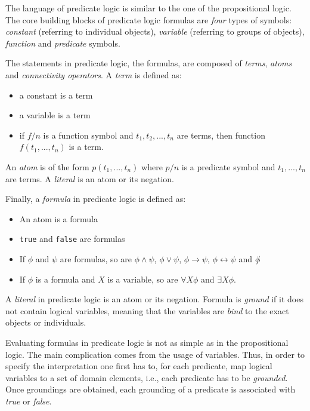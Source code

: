 The language of predicate logic is similar to the one of the propositional logic.
The core building blocks of predicate logic formulas are \textit{four} types of symbols: \textit{constant} (referring to individual objects), \textit{variable} (referring to groups of objects), \textit{function} and \textit{predicate} symbols.


The statements in predicate logic, the formulas, are composed of \textit{terms}, \textit{atoms} and \textit{connectivity operators}.
A \textit{term} is defined as:
\begin{itemize}
	\item a constant is a term
	\item a variable is a term
	\item if $f / n$ is a function symbol and $t_1,t_2,...,t_n$ are terms, then function $f(t_1,...,t_n)$ is a term.
\end{itemize}


An \textit{atom} is of the form $p(t_1,...,t_n)$ where $p/n$ is a predicate symbol and $t_1,...,t_n$ are terms.
A \textit{literal} is an atom or its negation.


Finally, a \textit{formula} in predicate logic is defined as:
\begin{itemize}
	\item An atom is a formula
	\item \texttt{true} and \texttt{false} are formulas
	\item If $\phi$ and $\psi$ are formulas, so are $\phi \wedge \psi$, $\phi \vee \psi$, $\phi \rightarrow \psi$, $\phi \leftrightarrow \psi$ and $\not \phi$
	\item If $\phi$ is a formula and $X$ is a variable, so are $\forall X \phi$ and $\exists X \phi$.
\end{itemize}


A \textit{literal} in predicate logic is an atom or its negation.
Formula is \textit{ground} if it does not contain logical variables, meaning that the variables are \textit{bind} to the exact objects or individuals.


 
 
 


Evaluating formulas in predicate logic is not as simple as in the propositional logic.
The main complication comes from the usage of variables.
Thus, in order to specify the interpretation one first has to, for each predicate,  map logical variables to a set of domain elements, i.e., each predicate has to be \textit{grounded}.
Once groundings are obtained, each grounding of a predicate is associated with \textit{true} or \textit{false}.



